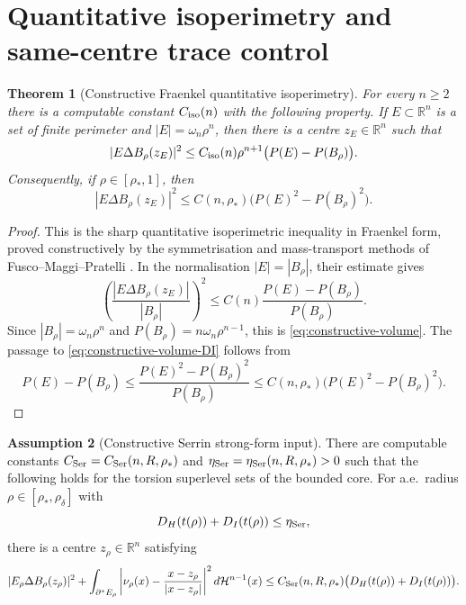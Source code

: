 \documentclass[11pt]{amsart}
\newtheorem{theorem}{Theorem}[section]
\theoremstyle{definition}
\newtheorem{assumption}[theorem]{Assumption}
\newcommand{\R}{\mathbb R}
\newcommand{\rstar}{\rho_*}
\newcommand{\rdel}{\rho_\delta}
\newcommand{\Hn}{\mathcal H^{n-1}}
\newcommand{\Per}{P}
\begin{document}
\section{Quantitative isoperimetry and same-centre trace control}
\label{sec:samecentre}

\begin{theorem}[Constructive Fraenkel quantitative isoperimetry]
\label{thm:constructive-fraenkel}
For every \(n\ge2\) there is a computable constant
\(C_{\rm iso}(n)\) with the following property.  If
\(E\subset\R^n\) is a set of finite perimeter and
\(|E|=\omega_n\rho^n\), then there is a centre \(z_E\in\R^n\) such that
\begin{equation}\label{eq:constructive-volume}
   |E\Delta B_\rho(z_E)|^2
   \le
   C_{\rm iso}(n)\rho^{n+1}\bigl(\Per(E)-\Per(B_\rho)\bigr).
\end{equation}
Consequently, if \(\rho\in[\rstar,1]\), then
\begin{equation}\label{eq:constructive-volume-DI}
   |E\Delta B_\rho(z_E)|^2
   \le C(n,\rstar)\bigl(\Per(E)^2-\Per(B_\rho)^2\bigr).
\end{equation}
\end{theorem}

\begin{proof}
This is the sharp quantitative isoperimetric inequality in Fraenkel form,
proved constructively by the symmetrisation and mass-transport methods of
Fusco--Maggi--Pratelli \cite{FMP}.  In the normalisation
\(|E|=|B_\rho|\), their estimate gives
\[
   \left(\frac{|E\Delta B_\rho(z_E)|}{|B_\rho|}\right)^2
   \le C(n)\frac{\Per(E)-\Per(B_\rho)}{\Per(B_\rho)} .
\]
Since \(|B_\rho|=\omega_n\rho^n\) and
\(\Per(B_\rho)=n\omega_n\rho^{n-1}\), this is
\eqref{eq:constructive-volume}.  The passage to
\eqref{eq:constructive-volume-DI} follows from
\[
   \Per(E)-\Per(B_\rho)
   \le \frac{\Per(E)^2-\Per(B_\rho)^2}{\Per(B_\rho)}
   \le C(n,\rstar)\bigl(\Per(E)^2-\Per(B_\rho)^2\bigr).
\]
\end{proof}

\begin{assumption}[Constructive Serrin strong-form input]
\label{ass:constructive-strong}
There are computable constants
\(C_{\rm Ser}=C_{\rm Ser}(n,R,\rstar)\) and
\(\eta_{\rm Ser}=\eta_{\rm Ser}(n,R,\rstar)>0\) such that the following holds
for the torsion superlevel sets of the bounded core.  For a.e.\ radius
\(\rho\in[\rstar,\rdel]\) with
\[
   D_H(t(\rho))+D_I(t(\rho))\le\eta_{\rm Ser},
\]
there is a centre \(z_\rho\in\R^n\) satisfying
\begin{equation}\label{eq:constructive-strong}
   |E_\rho\Delta B_\rho(z_\rho)|^2
   +
   \int_{\partial^*E_\rho}
      \left|\nu_\rho(x)-\frac{x-z_\rho}{|x-z_\rho|}\right|^2d\Hn(x)
   \le
   C_{\rm Ser}(n,R,\rstar)
      \bigl(D_H(t(\rho))+D_I(t(\rho))\bigr).
\end{equation}
\end{assumption}
\end{document}
